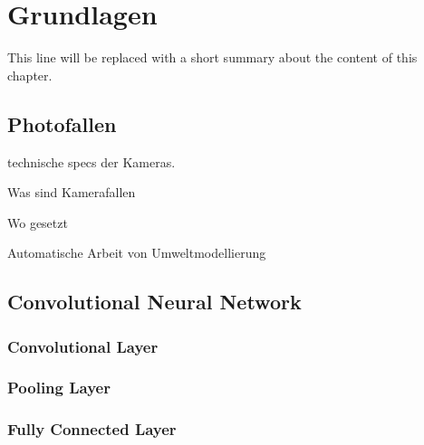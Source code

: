 \chapter{Grundlagen} \label{chap:grundlagen}

This line will be replaced with a short summary about the content of this chapter.

\section{Photofallen}

technische specs der Kameras.

Was sind Kamerafallen

Wo gesetzt

Automatische Arbeit von Umweltmodellierung

\section{Convolutional Neural Network} \label{sec:cnn}

\subsection{Convolutional Layer}

\subsection{Pooling Layer}

\subsection{Fully Connected Layer}